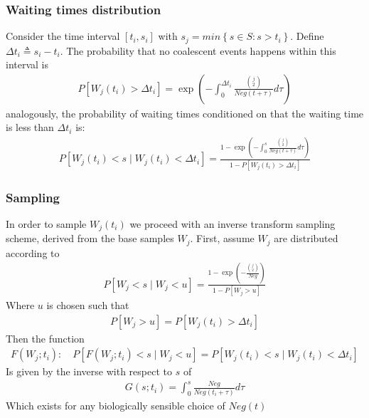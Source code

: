 \documentclass{report}
\theoremstyle{definition}
\begin{document}
\subsubsection{Waiting times distribution}
Consider the time interval $[t_i, s_i]$ with $s_j = min\left\{s\in S : s>t_i\right\}$. Define $\Delta t_i \triangleq s_i-t_i$.
The probability that no coalescent events happens within this interval is 
\begin{gather*}
  P[W_j(t_i) > \Delta t_i] = \exp(-\int_0^{\Delta t_i}\frac{\binom{j}{2}}{Neg(t+\tau)}d\tau)
\end{gather*}
analogously, the probability of waiting times conditioned on that the waiting time is less than $\Delta t_i$ is:
\begin{gather}
  P[W_j(t_i) < s \mid W_j(t_i) < \Delta t_i] =\frac{1-\exp(-\int_0^{s}\frac{\binom{j}{2}}{Neg(t+\tau)}d\tau)}{1-P[W_j(t_i) > \Delta t_i]}
\end{gather}
\subsubsection{Sampling}
In order to sample $W_j(t_i)$ we proceed with an inverse transform sampling scheme, derived from the base samples $W_j$. 
First, assume $W_j$ are distributed according to 
\begin{gather}
  P[W_j < s \mid W_j < u] = \frac{1-\exp(-\frac{\binom{j}{2}}{Neg})}{1-P[W_j>u]}
\end{gather}
Where $u$ is chosen such that
\begin{gather}
P[W_j>u] = P[W_j(t_i) > \Delta t_i]
\end{gather}
Then the function
\begin{gather}
F(W_j; t_i):\quad P[F(W_j;t_i) < s \mid W_j < u] = P[W_j(t_i) < s \mid W_j(t_i) < \Delta t_i] 
\end{gather}
Is given by the inverse with respect to $s$ of
\begin{gather}
G(s; t_i) = \int_0^s \frac{Neg}{Neg(t_i+\tau)}d\tau
\end{gather}
Which exists for any biologically sensible choice of $Neg(t)$
\end{document}
